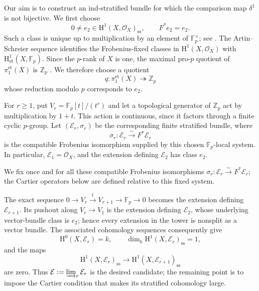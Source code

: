\documentclass[12pt,a4]{amsart}
\theoremstyle{definition}
\begin{document}
Our aim is to construct an ind-stratified bundle for which the comparison
map $\delta^1$ is not bijective.  We first choose
\[
0\ne e_2\in\mathrm H^1(X,\mathcal O_X)_\mathrm{ss},
\qquad F^*e_2=e_2.
\]
Such a class is unique up to multiplication by an element of
$\mathbb F_p^\times$; see \cite[\S14, Corollary, p.~143]{Mu70}.
The Artin--Schreier sequence identifies the Frobenius-fixed classes in
$\mathrm H^1(X,\mathcal O_X)$ with
$\mathrm H^1_{\mathrm{et}}(X,\mathbb F_p)$.  Since the $p$-rank of $X$ is
one, the maximal pro-$p$ quotient of $\pi_1^{\mathrm{et}}(X)$ is
$\mathbb Z_p$ \cite[Theorem~1.9]{Cre84}.  We therefore choose a quotient
\[
q:\pi_1^{\mathrm{et}}(X)\twoheadrightarrow\mathbb Z_p
\]
whose reduction modulo $p$ corresponds to $e_2$.

For $r\geq1$, put $V_r=\mathbb F_p[t]/(t^r)$ and let a topological generator of
$\mathbb Z_p$ act by multiplication by $1+t$.  This action is continuous,
since it factors through a finite cyclic $p$-group.  Let
$(\mathcal E_r,\sigma_r)$ be the corresponding finite stratified bundle,
where
\[
\sigma_r:\mathcal E_r\xrightarrow{\sim}F^*\mathcal E_r
\]
is the compatible Frobenius isomorphism supplied by this chosen
$\mathbb F_p$-local system.  In particular,
$\mathcal E_1=\mathcal O_X$, and the extension defining
$\mathcal E_2$ has class $e_2$.

We fix once and for all these compatible Frobenius isomorphisms
$\sigma_r:\mathcal E_r\xrightarrow{\sim}F^*\mathcal E_r$; the Cartier
operators below are defined relative to this fixed system.

The exact sequence
$0\to V_r\xrightarrow{t}V_{r+1}\to\mathbb F_p\to0$ becomes the extension
defining $\mathcal E_{r+1}$.  Its pushout along $V_r\to V_1$ is the extension
defining $\mathcal E_2$, whose underlying vector-bundle class is $e_2$;
hence every extension in the tower is nonsplit as a vector bundle.  The
associated cohomology sequences consequently give
\[
\mathrm H^0(X,\mathcal E_r)=k,
\qquad \dim_k\mathrm H^1(X,\mathcal E_r)_\mathrm{ss}=1,
\]
and the maps
\[
\mathrm H^1(X,\mathcal E_r)_\mathrm{ss}
\longrightarrow \mathrm H^1(X,\mathcal E_{r+1})_\mathrm{ss}
\]
are zero.  Thus $\mathcal E:=\varinjlim_r\mathcal E_r$ is the desired
candidate; the remaining point is to impose the Cartier condition that makes
its stratified cohomology large.
\end{document}
